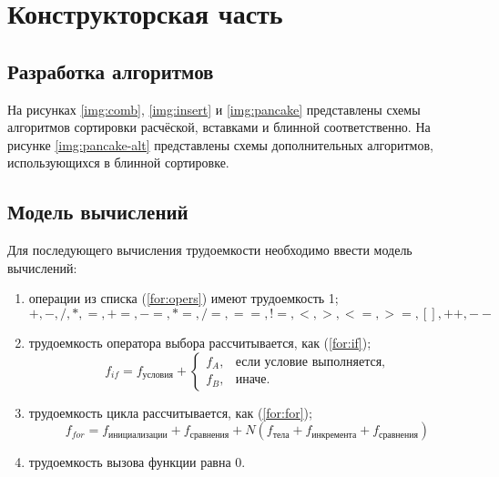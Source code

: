 \chapter{Конструкторская часть}

\section{Разработка алгоритмов}

На рисунках \ref{img:comb}, \ref{img:insert} и \ref{img:pancake} представлены схемы алгоритмов сортировки расчёской, вставками и блинной соответственно.
На рисунке \ref{img:pancake-alt} представлены схемы дополнительных алгоритмов, использующихся в блинной сортировке.

\clearpage
{}
\clearpage

\section{Модель вычислений}

Для последующего вычисления трудоемкости необходимо ввести модель вычислений:
\begin{enumerate}
    \item операции из списка (\ref{for:opers}) имеют трудоемкость 1;
        \begin{equation}
            \label{for:opers}
            +, -, /, *, =, +=, -=, *=, /=, ==, !=, <, >, <=, >=, [], ++, {-}-
        \end{equation}
    \item трудоемкость оператора выбора  рассчитывается, как (\ref{for:if});
	\begin{equation}
        \label{for:if}
        f_{if} = f_{\text{условия}} +
        \begin{cases}
        f_A, & \text{если условие выполняется,}\\
        f_B, & \text{иначе.}
        \end{cases}
	\end{equation}
\item трудоемкость цикла рассчитывается, как (\ref{for:for});
    \begin{equation}
        \label{for:for}
        f_{for} = f_{\text{инициализации}} + f_{\text{сравнения}} + N(f_{\text{тела}} + f_{\text{инкремента}} + f_{\text{сравнения}})
    \end{equation}
	\item трудоемкость вызова функции равна 0.
\end{enumerate}


